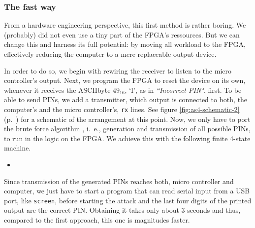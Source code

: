 \subsubsection*{The fast way}
From a hardware engineering perspective, this first method is rather boring. We (probably) did not even use a tiny part of the FPGA's ressources. 
But we can change this and harness its full potential: by moving all workload to the FPGA, effectively reducing the computer to a mere replaceable output device. 

In order to do so, we begin with rewiring the receiver to listen to the micro controller's output.
Next, we program the FPGA to reset the device on its own, whenever it receives the ASCIIbyte $49_{16}$, `I', as in \textit{``Incorrect PIN"}, first. 
To be able to send PINs, we add a transmitter, which output is connected to both, the computer's and the micro controller's, \texttt{rx} lines. 
See figure \ref{fig:as4-schematic-2} (p.~\pageref{fig:as4-schematic-2}) for a schematic of the arrangement at this point.
Now, we only have to port the brute force algorithm , i.~e., generation and transmission of all possible PINs, to run in the logic on the FPGA. We achieve this with the following finite 4-state machine.

\begin{itemize}
    \item[] 
\end{itemize}

Since transmission of the generated PINs reaches both, micro controller and computer, we just have to start a program that can read serial input from a USB port, like \texttt{screen}, before starting the attack and the last four digits of the printed output are the correct PIN. Obtaining it takes only about 3 seconds and thus, compared to the first approach, this one is magnitudes faster.

